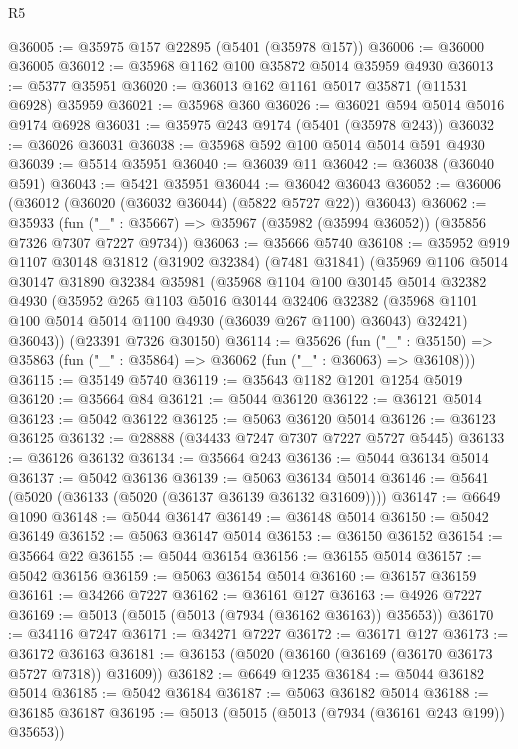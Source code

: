 \begin{lexlean}{R5}
\begin{coremodule}
@36005 := @35975 @157 @22895 (@5401 (@35978 @157))
@36006 := @36000 @36005
@36012 := @35968 @1162 @100 @35872 @5014 @35959 @4930
@36013 := @5377 @35951
@36020 := @36013 @162 @1161 @5017 @35871 (@11531 @6928) @35959
@36021 := @35968 @360
@36026 := @36021 @594 @5014 @5016 @9174 @6928
@36031 := @35975 @243 @9174 (@5401 (@35978 @243))
@36032 := @36026 @36031
@36038 := @35968 @592 @100 @5014 @5014 @591 @4930
@36039 := @5514 @35951
@36040 := @36039 @11
@36042 := @36038 (@36040 @591)
@36043 := @5421 @35951
@36044 := @36042 @36043
@36052 := @36006 (@36012 (@36020 (@36032 @36044) (@5822 @5727 @22)) @36043)
@36062 := @35933
    (fun ("_" : @35667) => @35967 (@35982 (@35994 @36052)) (@35856 @7326 @7307 @7227 @9734))
@36063 := @35666 @5740
@36108 := @35952
    @919
    @1107
    @30148
    @31812
    (@31902 @32384)
    (@7481 @31841)
    (@35969
      @1106
      @5014
      @30147
      @31890
      @32384
      @35981
      (@35968
        @1104
        @100
        @30145
        @5014
        @32382
        @4930
        (@35952
          @265
          @1103
          @5016
          @30144
          @32406
          @32382
          (@35968 @1101 @100 @5014 @5014 @1100 @4930 (@36039 @267 @1100) @36043)
          @32421)
        @36043))
    (@23391 @7326 @30150)
@36114 := @35626
    (fun ("_" : @35150) => @35863 (fun ("_" : @35864) => @36062 (fun ("_" : @36063) => @36108)))
@36115 := @35149 @5740
@36119 := @35643 @1182 @1201 @1254 @5019
@36120 := @35664 @84
@36121 := @5044 @36120
@36122 := @36121 @5014
@36123 := @5042 @36122
@36125 := @5063 @36120 @5014
@36126 := @36123 @36125
@36132 := @28888 (@34433 @7247 @7307 @7227 @5727 @5445)
@36133 := @36126 @36132
@36134 := @35664 @243
@36136 := @5044 @36134 @5014
@36137 := @5042 @36136
@36139 := @5063 @36134 @5014
@36146 := @5641 (@5020 (@36133 (@5020 (@36137 @36139 @36132 @31609))))
@36147 := @6649 @1090
@36148 := @5044 @36147
@36149 := @36148 @5014
@36150 := @5042 @36149
@36152 := @5063 @36147 @5014
@36153 := @36150 @36152
@36154 := @35664 @22
@36155 := @5044 @36154
@36156 := @36155 @5014
@36157 := @5042 @36156
@36159 := @5063 @36154 @5014
@36160 := @36157 @36159
@36161 := @34266 @7227
@36162 := @36161 @127
@36163 := @4926 @7227
@36169 := @5013 (@5015 (@5013 (@7934 (@36162 @36163)) @35653))
@36170 := @34116 @7247
@36171 := @34271 @7227
@36172 := @36171 @127
@36173 := @36172 @36163
@36181 := @36153 (@5020 (@36160 (@36169 (@36170 @36173 @5727 @7318)) @31609))
@36182 := @6649 @1235
@36184 := @5044 @36182 @5014
@36185 := @5042 @36184
@36187 := @5063 @36182 @5014
@36188 := @36185 @36187
@36195 := @5013 (@5015 (@5013 (@7934 (@36161 @243 @199)) @35653))

\end{coremodule}
\end{lexlean}
